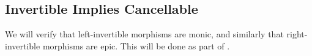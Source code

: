 \subsection{Invertible Implies Cancellable}

We will verify that left-invertible morphisms are monic, and similarly that right-invertible morphisms are epic.
This will be done as part of .
